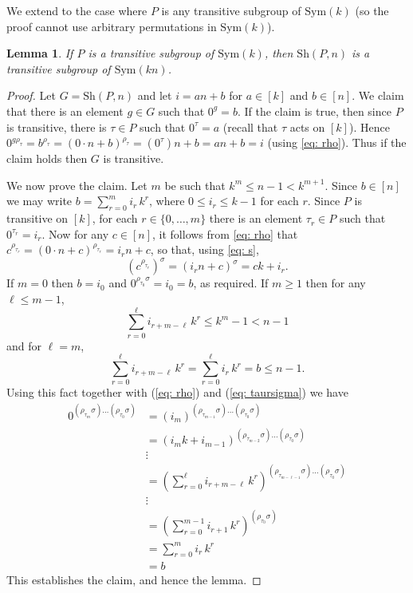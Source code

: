 \documentclass[12pt]{amsart}
\newtheorem{lem}[thm]{Lemma}
\theoremstyle{remark}
\theoremstyle{definition}
\newcounter{claim}[thm]
\newcommand{\sym}{\mathrm{Sym}}
\newcommand{\sh}{\mathrm{Sh}}
\begin{document}
We extend \cite[Proposition 3]{MM} to the case where $P$ is any transitive subgroup of $\sym(k)$ (so the proof cannot use arbitrary permutations in $\sym(k)$).

\begin{lem} \label{lemma:transitive1}
If $P$ is a transitive subgroup of $\sym(k)$, then $\sh(P,n)$ is a transitive subgroup of $\sym(kn)$.
\end{lem}

\begin{proof}
Let $G = \sh(P,n)$ and let $i = an+b$ for $a \in [k]$ and $b \in [n]$.  We claim that there is an element $g \in G$ such that $0^g = b$. If the claim is true, then since $P$ is transitive, there is $\tau \in P$ such that $0^\tau = a$ (recall that $\tau$ acts on $[k]$). Hence $0^{g \rho_\tau} = b^{\rho_\tau} = (0 \cdot n + b)^{\rho_\tau}  = (0^\tau)n + b = an+b = i$ (using \eqref{eq: rho}). Thus if the claim holds then $G$ is transitive.

We now prove the claim. Let $m$ be such that $k^m \leqslant n-1 < k^{m+1}$. Since $b \in [n]$ we may write $b = \sum_{r=0}^m i_r\, k^r$, where $0 \leqslant i_r \leqslant k-1$ for each $r$. Since $P$ is transitive on $[k]$, for each $r \in \{0, \ldots, m\}$ there is an element $\tau_r \in P$ such that $0^{\tau_r} = i_r$. Now for any  $c \in [n]$, it follows from \eqref{eq: rho} that 
$c^{\rho_{\tau_r}} = (0 \cdot n + c)^{\rho_{\tau_r}} = i_r n + c$, so that, using \eqref{eq: s}, 
	\begin{equation} \label{eq: taursigma}
	(c^{\rho_{\tau_r}})^ \sigma  = (i_r n + c)^\sigma = ck + i_r.
	\end{equation}
If $m = 0$ then $b = i_0$ and $0^{\rho_{\tau_0}\sigma} = i_0 = b$, as required. If $m \geqslant 1$ then for any $\ell \leqslant m-1$,
	\[ \sum_{r=0}^\ell i_{r+m-\ell}\, k^r \leqslant k^m - 1 < n-1 \]
and for $\ell = m$,
	\[ \sum_{r=0}^\ell i_{r+m-\ell}\, k^r = \sum_{r=0}^\ell i_r\, k^r = b \leqslant n-1. \]
Using this fact together with (\ref{eq: rho}) and (\ref{eq: taursigma}) we have
	\begin{align*}
	0^{(\rho_{\tau_m}\sigma) \dots (\rho_{\tau_0}\sigma)}
	&= (i_m)^{(\rho_{\tau_{m-1}}\sigma) \dots (\rho_{\tau_0}\sigma)} \\
	&= (i_m k + i_{m-1})^{(\rho_{\tau_{m-2}}\sigma) \dots (\rho_{\tau_0}\sigma)} \\
	&\vdots \\
	&= \left(\sum_{r=0}^\ell i_{r+m-\ell}\, k^r\right)^{(\rho_{\tau_{m-\ell-1}}\sigma) \dots (\rho_{\tau_0}\sigma)} \\
	&\vdots \\
	&= \left (\sum_{r=0}^{m-1} i_{r+1}\, k^r \right )^{ (\rho_{\tau_0}\sigma)} \\
	&= \sum_{r=0}^m i_r\, k^r \\
	&= b
	\end{align*}
This establishes the claim, and hence the lemma.
\end{proof}
\end{document}
